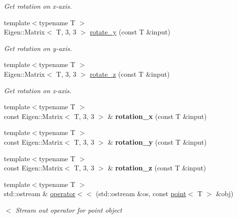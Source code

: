 \begin{DoxyCompactItemize}
\begin{DoxyCompactList}\small\item\em Get rotation on x-\/axis. \end{DoxyCompactList}\item 
{\footnotesize template$<$typename T $>$ }\\Eigen\+::\+Matrix$<$ T, 3, 3 $>$ \hyperlink{namespaceddd_a91c74ff16a602f1f611759e2e9f594f3}{rotate\+\_\+y} (const T \&input)
\begin{DoxyCompactList}\small\item\em Get rotation on y-\/axis. \end{DoxyCompactList}\item 
{\footnotesize template$<$typename T $>$ }\\Eigen\+::\+Matrix$<$ T, 3, 3 $>$ \hyperlink{namespaceddd_a8b9d6f84cbf4f443881fd3b3abad07e4}{rotate\+\_\+z} (const T \&input)
\begin{DoxyCompactList}\small\item\em Get rotation on z-\/axis. \end{DoxyCompactList}\item 
\mbox{\label{namespaceddd_ae7562b0e49ae64d1740ac6f68f81fdef}} 
{\footnotesize template$<$typename T $>$ }\\const Eigen\+::\+Matrix$<$ T, 3, 3 $>$ \& {\bfseries rotation\+\_\+x} (const T \&input)
\item 
\mbox{\label{namespaceddd_a99646f415772db90f4df4fb5dd4d458d}} 
{\footnotesize template$<$typename T $>$ }\\const Eigen\+::\+Matrix$<$ T, 3, 3 $>$ \& {\bfseries rotation\+\_\+y} (const T \&input)
\item 
\mbox{\label{namespaceddd_a03a4cb214ac10e4199f9cbe342cf68f6}} 
{\footnotesize template$<$typename T $>$ }\\const Eigen\+::\+Matrix$<$ T, 3, 3 $>$ \& {\bfseries rotation\+\_\+z} (const T \&input)
\item 
{\footnotesize template$<$typename T $>$ }\\std\+::ostream \& \hyperlink{namespaceddd_a02d73e2ba5a018e4e525deb8aea3c0a8}{operator$<$$<$} (std\+::ostream \&os, const \hyperlink{classddd_1_1point}{point}$<$ T $>$ \&obj)
\begin{DoxyCompactList}\small\item\em $<$ Stream out operator for point object \end{DoxyCompactList}\item 

\end{DoxyCompactItemize}
